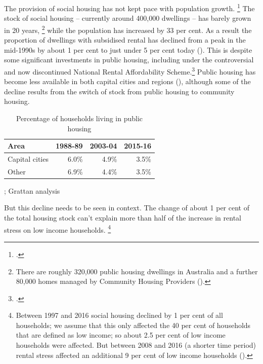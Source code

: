 The provision of social housing has not kept pace with population growth.%
\footnote{\textcite{Daley-etal-2017-Submission-NSW-housing-supply-inquiry}.}
The stock of social housing -- currently around 400,000 dwellings -- has barely grown in 20 years,%
    \footnote{There are roughly 320,000 public housing dwellings in Australia and a further 80,000 homes managed by Community Housing Providers (\textcites{PC2017GovServ}[][Table~G.1]{AIHW2017HousingAssist}).}
while the population has increased by 33 per cent.
As a result the proportion of dwellings with subsidised rental has declined from a peak in the mid-1990s by about 1 per cent to just under 5 per cent today ().
This is despite some significant investments in public housing, including under the controversial and now discontinued National Rental Affordability Scheme.\footcite{thomasNRAS2015}
Public housing has become less available in both capital cities and regions (), although some of the decline results from the switch of stock from public housing to community housing.

\begin{table}[!t]
\caption{Percentage of households living in public housing}\label{tbl:proportion-population-in-public-housing}

\begin{tabularx}{\linewidth}{Xrrr}
\toprule
\textbf{Area} & \textbf{1988-89} & \textbf{2003-04} & \textbf{2015-16}\tabularnewline
\midrule
Capital cities & 6.0\% & 4.9\% & 3.5\%\tabularnewline
Other & 6.9\% & 4.4\% & 3.5\%\tabularnewline
\bottomrule
\end{tabularx}
%
{\textcite{ABS-HES-201516-Microdata}; Grattan analysis}
\end{table}

But this decline needs to be seen in context. The change of about 1 per cent of the total housing stock can't explain more than half of the increase in rental stress on low income households.%
    \footnote{Between 1997 and 2016 social housing declined by 1 per cent of all households; we assume that this only affected the 40 per cent of households that are defined as low income; 
    so about 2.5 per cent of low income households were affected.
    But between 2008 and 2016 (a shorter time period) rental stress affected an additional 9 per cent of low income households ().}

